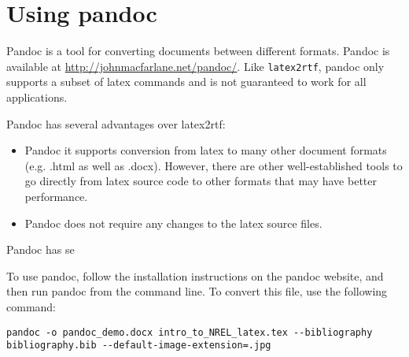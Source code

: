 \section{Using pandoc}
Pandoc is a tool for converting documents between different formats. Pandoc is available at \href{http://johnmacfarlane.net/pandoc/}{http://johnmacfarlane.net/pandoc/}. Like \texttt{latex2rtf}, pandoc only supports a subset of latex commands and is not guaranteed to work for all applications.

Pandoc has several advantages over latex2rtf:
\begin{itemize}
\item Pandoc it supports conversion from latex to many other document formats (e.g. .html as well as .docx). However, there are other well-established tools to go directly from latex source code to other formats that may have better performance.
\item Pandoc does not require any changes to the latex source files.
\end{itemize}

Pandoc has se

To use pandoc, follow the installation instructions on the pandoc website, and then run pandoc from the command line. To convert this file, use the following command:

\begin{verbatim}
pandoc -o pandoc_demo.docx intro_to_NREL_latex.tex --bibliography bibliography.bib --default-image-extension=.jpg
\end{verbatim}

